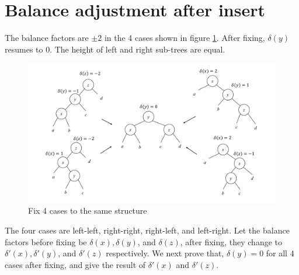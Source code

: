\documentclass[b5paper]{article}
\begin{document}
\section{Balance adjustment after insert}

The balance factors are $\pm 2$ in the 4 cases shown in figure \cref{fig:avl-insert-fix-appendix}. After fixing, $\delta(y)$ resumes
to 0. The height of left and right sub-trees are equal.

\begin{figure}[htbp]
  \centering
  \includegraphics[scale=0.4]{../../../datastruct/tree/AVL-tree/img/avl-insert-fix}
  \caption{Fix 4 cases to the same structure}
  \label{fig:avl-insert-fix-appendix}
\end{figure}

The four cases are left-left, right-right, right-left, and left-right. Let the balance factors before fixing be $\delta(x), \delta(y)$, and $\delta(z)$, after fixing, they change to $\delta'(x), \delta'(y)$, and $\delta'(z)$ respectively. We next prove that, $\delta(y)=0$ for all 4 cases after fixing, and give the result of $\delta'(x)$ and $\delta'(z)$.
\end{document}
